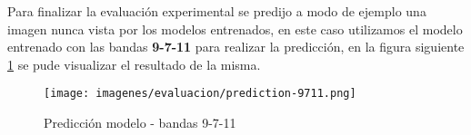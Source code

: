 Para finalizar la evaluación experimental se predijo a modo de ejemplo una imagen nunca vista por los modelos entrenados, en este caso utilizamos el modelo entrenado con las bandas \textbf{9-7-11} para realizar la predicción, en la figura siguiente  \ref{Fig: TP} se pude visualizar el resultado de la misma.

\begin{figure}[H]\centering
  \texttt{[image: imagenes/evaluacion/prediction-9711.png]}
  \caption{Predicción modelo - bandas 9-7-11} \label{Fig: TP}
\end{figure}














